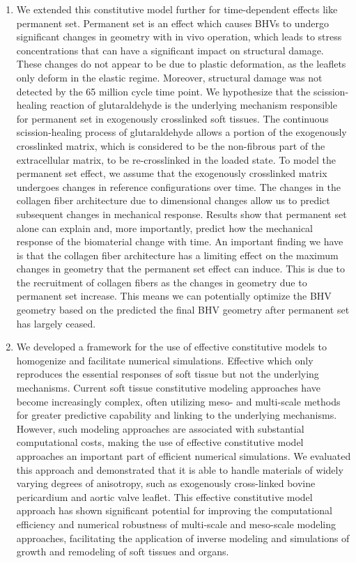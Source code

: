\begin{enumerate}
        \item We extended this constitutive model further for time-dependent effects like permanent set. Permanent set is an effect which causes BHVs to undergo significant changes in geometry with in vivo operation, which leads to stress concentrations that can have a significant impact on structural damage. These changes do not appear to be due to plastic deformation, as the leaflets only deform in the elastic regime. Moreover, structural damage was not detected by the 65 million cycle time point. We hypothesize that the scission-healing reaction of glutaraldehyde is the underlying mechanism responsible for permanent set in exogenously crosslinked soft tissues. The continuous scission-healing process of glutaraldehyde allows a portion of the exogenously crosslinked matrix, which is considered to be the non-fibrous part of the extracellular matrix, to be re-crosslinked in the loaded state. To model the permanent set effect, we assume that the exogenously crosslinked matrix undergoes changes in reference configurations over time. The changes in the collagen fiber architecture due to dimensional changes allow us to predict subsequent changes in mechanical response. Results show that permanent set alone can explain and, more importantly, predict how the mechanical response of the biomaterial change with time. An important finding we have is that the collagen fiber architecture has a limiting effect on the maximum changes in geometry that the permanent set effect can induce. This is due to the recruitment of collagen fibers as the changes in geometry due to permanent set increase. This means we can potentially optimize the BHV geometry based on the predicted the final BHV geometry after permanent set has largely ceased. 
        \item We developed a framework for the use of effective constitutive models to homogenize and facilitate numerical simulations. Effective which only reproduces the essential responses of soft tissue but not the underlying mechanisms. Current soft tissue constitutive modeling approaches have become increasingly complex, often utilizing meso- and multi-scale methods for greater predictive capability and linking to the underlying mechanisms. However, such modeling approaches are associated with substantial computational costs, making the use of effective constitutive model approaches an important part of efficient numerical simulations. We evaluated this approach and demonstrated that it is able to handle materials of widely varying degrees of anisotropy, such as exogenously cross-linked bovine pericardium and aortic valve leaflet. This effective constitutive model approach has shown significant potential for improving the computational efficiency and numerical robustness of multi-scale and meso-scale modeling approaches, facilitating the application of inverse modeling and simulations of growth and remodeling of soft tissues and organs.

\end{enumerate}
